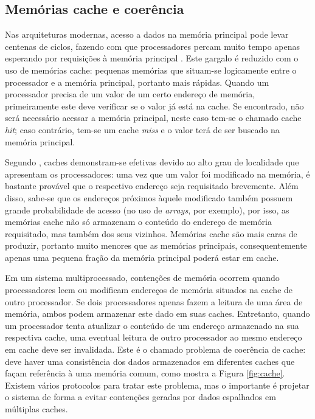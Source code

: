 \documentclass[ccc, pg2]{esinucpel}
\begin{document}
\subsection{Memórias cache e coerência} \label{sec:cache}
Nas arquiteturas modernas, acesso a dados na memória principal pode levar centenas de ciclos, fazendo com que processadores percam muito tempo apenas esperando por requisições à memória principal \cite{bib:herlihy:theart}. Este gargalo é reduzido com o uso de memórias cache: pequenas memórias que situam-se logicamente entre o processador e a memória principal, portanto mais rápidas. Quando um processador precisa de um valor de um certo endereço de memória, primeiramente este deve verificar se o valor já está na cache. Se encontrado, não será necessário acessar a memória principal, neste caso tem-se o chamado cache {\it hit}; caso contrário, tem-se um cache {\it miss} e o valor terá de ser buscado na memória principal.

Segundo \cite{bib:herlihy:theart}, caches demonstram-se efetivas devido ao alto grau de localidade que apresentam os processadores: uma vez que um valor foi modificado na memória, é bastante provável que o respectivo endereço seja requisitado brevemente. Além disso, sabe-se que os endereços próximos àquele modificado também possuem grande probabilidade de acesso (no uso de {\it arrays}, por exemplo), por isso, as memórias cache não só armazenam o conteúdo do endereço de memória requisitado, mas também dos seus vizinhos. Memórias cache são mais caras de produzir, portanto muito menores que as memórias principais, consequentemente apenas uma pequena fração da memória principal poderá estar em cache.

Em um sistema multiprocessado, contenções de memória ocorrem quando processadores leem ou modificam endereços de memória situados na cache de outro processador. Se dois processadores apenas fazem a leitura de uma área de memória, ambos podem armazenar este dado em suas caches. Entretanto, quando um processador tenta atualizar o conteúdo de um endereço armazenado na sua respectiva cache, uma eventual leitura de outro processador ao mesmo endereço em cache deve ser invalidada. Este é o chamado problema de coerência de cache: deve haver uma consistência dos dados armazenados em diferentes caches que façam referência à uma memória comum, como mostra a Figura \ref{fig:cache}. Existem vários protocolos para tratar este problema, mas o importante é projetar o sistema de forma a evitar contenções geradas por dados espalhados em múltiplas caches.
\end{document}
